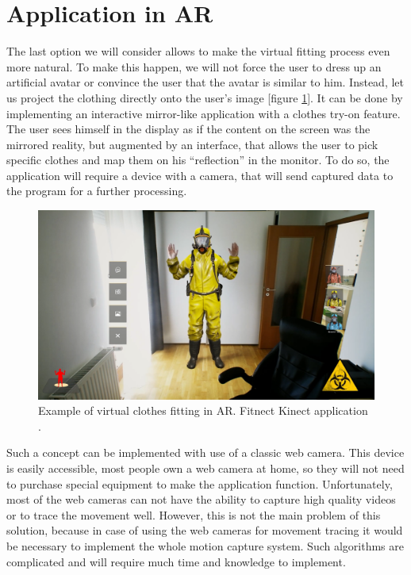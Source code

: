 \documentclass[a4paper]{report}
\begin{document}
\section{Application in AR}
\label{section_AR}
\qquad The last option we will consider allows to make the virtual fitting process even more natural. To make this happen, we will not force the user to dress up an artificial avatar or convince the user that the avatar is similar to him. Instead, let us project the clothing directly onto the user's image [figure \ref{fig:example_ar}]. It can be done by implementing an interactive mirror-like application with a clothes try-on feature. The user sees himself in the display as if the content on the screen was the mirrored reality, but augmented by an interface, that allows the user to pick specific clothes and map them on his “reflection” in the monitor. To do so, the application will require a device with a camera, that will send captured data to the program for a further processing. 

\begin{figure}[H]
  \includegraphics[width=\textwidth, keepaspectratio]{images/VFR/VFR_example_AR.png}
  \caption{Example of virtual clothes fitting in AR. Fitnect Kinect application \cite{Fitnect}.} 
  \label{fig:example_ar}
\end{figure}


\bigskip Such a concept can be implemented with use of a classic web camera. This device is easily accessible, most people own a web camera at home, so they will not need to purchase special equipment to make the application function. Unfortunately, most of the web cameras can not have the ability to capture high quality videos or to trace the movement well. However, this is not the main problem of this solution, because in case of using the web cameras for movement tracing it would be necessary to implement the whole motion capture system. Such algorithms are complicated and will require much time and knowledge to implement.
\end{document}
